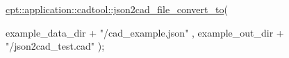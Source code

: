 \begin{DoxyCodeInclude}
    \hyperlink{namespacecpt_1_1application_1_1cadtool_ae5bf293a816e3b11cabec9d81f83993b}{cpt::application::cadtool::json2cad\_file\_convert\_to}(
       
          example\_data\_dir + \textcolor{stringliteral}{"/cad\_example.json"}
        , example\_out\_dir + \textcolor{stringliteral}{"/json2cad\_test.cad"} 
    );
\end{DoxyCodeInclude}
